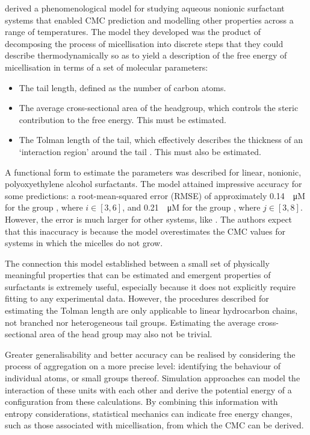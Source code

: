 \citet{puvvadaMolecularThermodynamicApproach1990} derived a phenomenological model for studying aqueous nonionic surfactant systems that enabled CMC prediction and modelling other properties across a range of temperatures. The model they developed was the product of decomposing the process of micellisation into discrete steps that they could describe thermodynamically so as to yield a description of the free energy of micellisation in terms of a set of molecular parameters:

\begin{itemize}
    \item The tail length, defined as the number of carbon atoms.
    \item The average cross-sectional area of the headgroup, which controls the
          steric contribution to the free energy. This must be estimated.
    \item The Tolman length of the tail, which effectively describes the
          thickness of an `interaction region' around the tail
          \cite{demiguelGibbsThermodynamicsSurface2021}. This must also be estimated.
\end{itemize}

A functional form to estimate the parameters was described for linear, nonionic, polyoxyethylene alcohol surfactants. The model attained impressive accuracy for some predictions: a root-mean-squared error (RMSE) of approximately \SI{0.14}{\log \micro M} for the group , where $i \in [3, 6]$, and \SI{0.21}{\log \micro M} for the group , where $j \in [3, 8]$.
However, the error is much larger for other systems, like . The
authors expect that this inaccuracy is because the model overestimates the CMC values for systems in which the micelles do not grow.

The connection this model established between a small set of physically meaningful properties that can be estimated and emergent properties of surfactants is extremely useful, especially because it does not explicitly require fitting to any experimental data. However, the procedures described for estimating the Tolman length are only applicable to linear hydrocarbon chains, not branched nor heterogeneous tail groups. Estimating the average cross-sectional area of the head group may also not be trivial.

Greater generalisability and better accuracy can be realised by considering the
process of aggregation on a more precise level: identifying the behaviour of
individual atoms, or small groups thereof. Simulation approaches can model the
interaction of these units with each other and derive the potential energy of a
configuration from these calculations. By combining this information with
entropy considerations, statistical mechanics can indicate free energy changes,
such as those associated with micellisation, from which the CMC can be derived.

